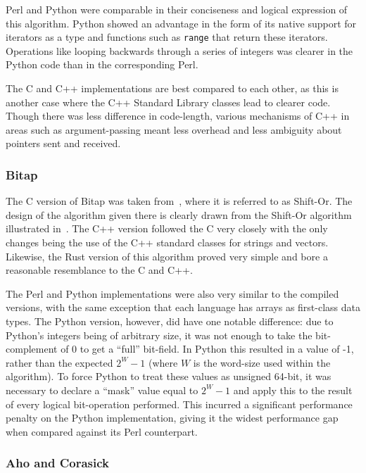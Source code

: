 Perl and Python were comparable in their conciseness and logical expression of this algorithm. Python showed an advantage in the form of its native support for iterators as a type and functions such as \texttt{range} that return these iterators. Operations like looping backwards through a series of integers was clearer in the Python code than in the corresponding Perl.

The C and C++ implementations are best compared to each other, as this is another case where the C++ Standard Library classes lead to clearer code. Though there was less difference in code-length, various mechanisms of C++ in areas such as argument-passing meant less overhead and less ambiguity about pointers sent and received.

\subsubsection{Bitap}

The C version of Bitap was taken from~\cite[Chapter 5]{handbook}, where it is referred to as Shift-Or. The design of the algorithm given there is clearly drawn from the Shift-Or algorithm illustrated in~\cite{baeza}. The C++ version followed the C very closely with the only changes being the use of the C++ standard classes for strings and vectors. Likewise, the Rust version of this algorithm proved very simple and bore a reasonable resemblance to the C and C++.

The Perl and Python implementations were also very similar to the compiled versions, with the same exception that each language has arrays as first-class data types. The Python version, however, did have one notable difference: due to Python's integers being of arbitrary size, it was not enough to take the bit-complement of 0 to get a ``full'' bit-field. In Python this resulted in a value of -1, rather than the expected $2^W - 1$ (where $W$ is the word-size used within the algorithm). To force Python to treat these values as unsigned 64-bit, it was necessary to declare a ``mask'' value equal to $2^W - 1$ and apply this to the result of every logical bit-operation performed. This incurred a significant performance penalty on the Python implementation, giving it the widest performance gap when compared against its Perl counterpart.

\subsubsection{Aho and Corasick}

